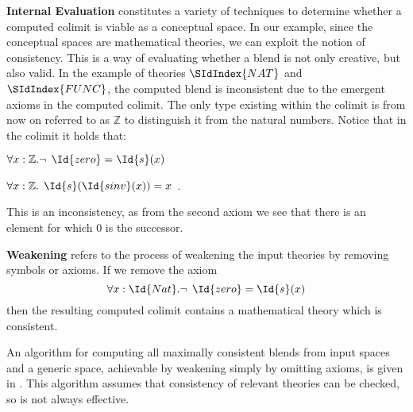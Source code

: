 {\bf Internal Evaluation} constitutes a variety of techniques to determine whether a computed colimit is viable as a conceptual space. In our example, since the conceptual spaces are mathematical theories, we can exploit the notion of consistency. This is a way of evaluating whether a
blend is not only creative, but also valid. In the example of theories
$\SIdIndex{NAT}$ and $\SIdIndex{FUNC}$,
the computed blend is inconsistent due to the emergent axioms in the
computed colimit. The only type existing within the colimit is from now
on referred to as $\mathbb{Z}$ to distinguish it from the natural
numbers. Notice that in the colimit it holds that:
\begin{center}
  $\forall x: \mathbb{Z}. \neg \:\:   \Id{zero} = \Id{s}(x)$
\end{center}
\begin{center}
  $\forall x: \mathbb{Z}. \:\: \Id{s}(\Id{sinv}(x)) = x$ \:.
\end{center}
This is an inconsistency, as from the second axiom we see 
that there is an
element for which 0 is the successor.

{\bf Weakening} refers to the process of weakening the input
theories by removing symbols or axioms. If we remove the axiom 
$$
\forall x: \Id{Nat}. \neg \:\: \Id{zero} = \Id{s}(x)
$$
then the resulting computed colimit contains a mathematical theory
which is consistent.  

An algorithm for computing all maximally consistent blends from input
spaces and a generic space, achievable by weakening simply by omitting
axioms, is given in \textcite{MartinezEtAl14}. This algorithm assumes
that consistency of relevant theories can be checked, so is not always
effective.

